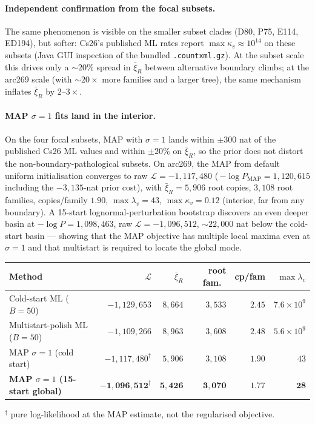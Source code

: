 \documentclass[11pt]{article}
\newcommand{\troot}{R}
\newcommand{\rate}{\kappa}             %
\newcommand{\dup}{\lambda}             %
\newcommand{\Ll}{\mathcal{L}}
\theoremstyle{definition}
\begin{document}
\paragraph{Independent confirmation from the focal subsets.}
The same phenomenon is visible on the smaller subset clades
(D80, P75, E114, ED194), but softer: Cs26's published ML rates report
$\max\rate_v \approx 10^{14}$ on these subsets (Java GUI inspection
of the bundled \texttt{.countxml.gz}). At the subset scale this
drives only a $\sim 20\%$ spread in $\bar\xi_\troot$ between
alternative boundary climbs; at the arc269 scale (with $\sim 20\times$
more families and a larger tree), the same mechanism inflates
$\bar\xi_\troot$ by $2$--$3\times$.

\paragraph{MAP $\sigma=1$ fits land in the interior.}
On the four focal subsets, MAP with $\sigma=1$ lands within
$\pm 300$ nat of the published Cs26 ML values and within $\pm 20\%$
on $\bar\xi_\troot$, so the prior does not distort the
non-boundary-pathological subsets. On arc269, the MAP from default
uniform initialisation converges to raw $\Ll = -1{,}117{,}480$
(\,$-\log P_{\mathrm{MAP}} = 1{,}120{,}615$ including the
$-3{,}135$-nat prior cost), with $\bar\xi_\troot = 5{,}906$ root
copies, $3{,}108$ root families, copies/family $1.90$,
$\max\dup_v = 43$, $\max\rate_v = 0.12$ (interior, far from any
boundary). A 15-start lognormal-perturbation bootstrap discovers an
even deeper basin at $-\log P = 1{,}098{,}463$, raw
$\Ll = -1{,}096{,}512$, $\sim 22{,}000$ nat below the cold-start
basin --- showing that the MAP objective has multiple local maxima
even at $\sigma = 1$ and that multistart is required to locate the
global mode.

\begin{center}
\begin{tabular}{lrrrrr}
\toprule
Method & $\Ll$ & $\bar\xi_\troot$ & root fam.\ & cp/fam & $\max\dup_v$ \\
\midrule
Cold-start ML ($B=50$) & $-1{,}129{,}653$ & $8{,}664$ & $3{,}533$ & $2.45$ & $7.6\times10^9$ \\
Multistart-polish ML ($B=50$) & $-1{,}109{,}266$ & $8{,}963$ & $3{,}608$ & $2.48$ & $5.6\times10^9$ \\
MAP $\sigma=1$ (cold start) & $-1{,}117{,}480^{\dagger}$ & $5{,}906$ & $3{,}108$ & $1.90$ & $43$ \\
\textbf{MAP $\sigma=1$ (15-start global)} & $\mathbf{-1{,}096{,}512^{\dagger}}$ & $\mathbf{5{,}426}$ & $\mathbf{3{,}070}$ & $\mathbf{1.77}$ & $\mathbf{28}$ \\
\bottomrule
\end{tabular}
\end{center}
{\small $^{\dagger}$ pure log-likelihood at the MAP estimate, not
the regularised objective.}
\end{document}
